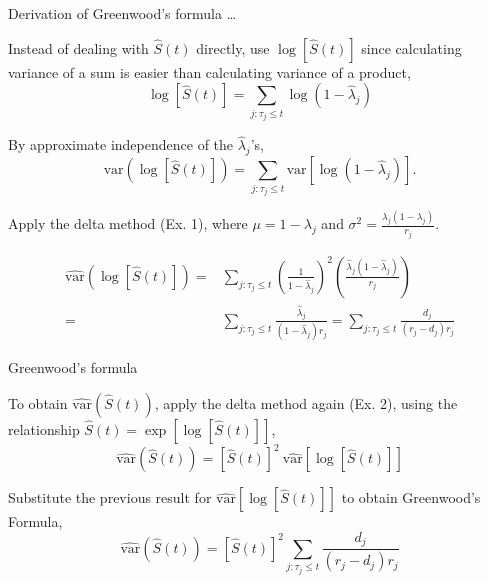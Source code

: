 \documentclass[ignorenonframetext,]{beamer}
\begin{document}
\begin{frame}{%
\protect\hypertarget{derivation-of-greenwoods-formula-2}{%
Derivation of Greenwood’s formula \ldots}}

Instead of dealing with \(\widehat{S}(t)\) directly, use
\(\log[\widehat{S}(t)]\) since calculating variance of a sum is easier
than calculating variance of a product,
\[ \log[\widehat{S}(t)] = \sum_{j: \tau_j \le t} \log(1-\widehat{\lambda}_j)  \]

By approximate independence of the \(\widehat{\lambda}_j\)’s,
\[\text{var}(\log[\widehat{S}(t)]) = 
\sum_{j: \tau_j \le t} \text{var}[\log(1-\widehat{\lambda}_j)]. \]

\small

Apply the delta method (Ex. 1), where \(\mu = 1 - \lambda_j\) and
\(\sigma^2 = \frac{{\lambda}_j (1-{\lambda}_j)}{r_j}\).

\vspace{-0.4cm}

\begin{align*}
\widehat{\text{var}}(\log[\widehat{S}(t)]) =& \sum_{j: \tau_j \leq t} \left(\frac{1}{1 - \widehat{\lambda}_j} \right)^2 \left(\frac{\widehat{{\lambda}}_j (1-\widehat{{\lambda}}_j)}{r_j} \right) \\
=& \sum_{j: \tau_j \leq t} \frac{\widehat{\lambda}_j}{(1-\widehat{\lambda}_j) r_j} = \sum_{j: \tau_j \leq t} \frac{d_j}{(r_j-d_j) r_j}
\end{align*}

\end{frame}

\begin{frame}{%
\protect\hypertarget{greenwoods-formula}{%
Greenwood’s formula}}

To obtain \(\widehat{\text{var}}(\widehat{S}(t))\), apply the delta
method again (Ex. 2), using the relationship
\(\widehat{S}(t) = \exp[\log[\widehat{S}(t)]]\),
\[\widehat{\text{var}}(\widehat{S}(t)) = [\widehat{S}(t)]^2 \ \widehat{\text{var}}\left[\log[\widehat{S}(t)] \right] \]

Substitute the previous result for
\(\widehat{\text{var}}\left[\log[\widehat{S}(t)] \right]\) to obtain
Greenwood’s Formula,
\[\widehat{\text{var}}(\widehat{S}(t)) = [\widehat{S}(t)]^2  \sum_{j: \tau_j \leq t} \frac{d_j}{(r_j-d_j) r_j} \]

\end{frame}
\end{document}
